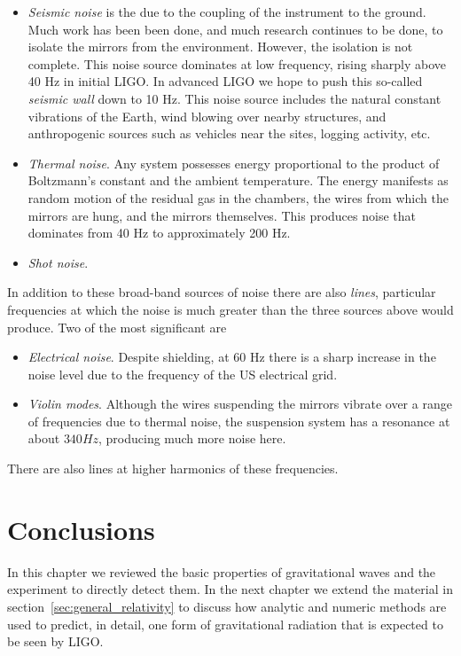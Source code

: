 \begin{itemize} 

\item \emph{Seismic noise} is the due to the coupling of the
instrument to the ground.  Much work has been been done, and much
research continues to be done, to isolate the mirrors from the
environment.  However, the isolation is not complete.  This noise
source dominates at low frequency, rising sharply above 40 Hz in
initial LIGO.  In advanced LIGO we hope to push this so-called
\emph{seismic wall} down to 10 Hz.  This noise source includes the
natural constant vibrations of the Earth, wind blowing over nearby
structures, and anthropogenic sources such as vehicles near the sites,
logging activity, etc.

\item \emph{Thermal noise}. Any system possesses energy proportional to 
the product of Boltzmann's constant and the ambient temperature.  The
energy manifests as random motion of the residual gas in the chambers,
the wires from which the mirrors are hung, and the mirrors themselves.
This produces noise that dominates from 40 Hz to approximately 200 Hz.

\item \emph{Shot noise}.

\end{itemize}

In addition to these broad-band sources of noise there are also
\emph{lines}, particular frequencies at which the noise is much
greater than the three sources above would produce.  Two of the most
significant are

\begin{itemize}
\item \emph{Electrical noise}.  Despite shielding, at 60 Hz there is a
sharp increase in the noise level due to the frequency of the US
electrical grid.
\item \emph{Violin modes}.  Although the wires suspending the mirrors
vibrate over a range of frequencies due to thermal noise, the
suspension system has a resonance at about $340 Hz$, producing much
more noise here.
\end{itemize}

There are also lines at higher harmonics of these frequencies.


\section{Conclusions}

In this chapter we reviewed the basic properties of gravitational
waves and the experiment to directly detect them.  In the next chapter
we extend the material in section~\ref{sec:general_relativity} to 
discuss how analytic and numeric methods are used to predict, in
detail, one form of gravitational radiation that is expected to be
seen by LIGO.





